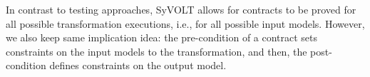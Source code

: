 In contrast to testing approaches, SyVOLT allows for contracts to
be proved for all possible transformation executions, i.e., for all possible
input models. However, we also keep same implication idea: the pre-condition of
a contract sets constraints on the input models to the transformation, and then,
the post-condition defines constraints on the output model.


